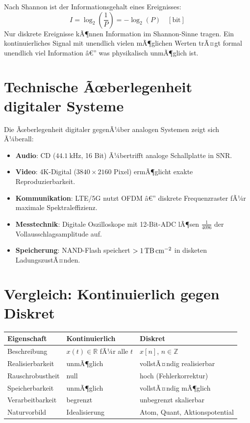 ﻿\documentclass[12pt,a4paper,titlepage]{report}
\begin{document}
Nach Shannon ist der Informationsgehalt eines Ereignisses:
\[
	I = \log_2\!\left(\frac{1}{P}\right) = -\log_2(P) \quad [\text{bit}]
\]
Nur diskrete Ereignisse kÃ¶nnen Information im Shannon-Sinne tragen. 
Ein kontinuierliches Signal mit unendlich vielen mÃ¶glichen Werten trÃ¤gt 
formal unendlich viel Information â€” was physikalisch unmÃ¶glich ist.

\section{Technische Ãœberlegenheit digitaler Systeme}

Die Ãœberlegenheit digitaler gegenÃ¼ber analogen Systemen zeigt sich Ã¼berall:

\begin{itemize}[leftmargin=2em]
	\item \textbf{Audio}: CD ($\SI{44.1}{\kilo\hertz}$, 16 Bit) Ã¼bertrifft analoge Schallplatte in SNR.
	\item \textbf{Video}: 4K-Digital ($3840 \times 2160$ Pixel) ermÃ¶glicht exakte Reproduzierbarkeit.
	\item \textbf{Kommunikation}: LTE/5G nutzt OFDM â€” diskrete Frequenzraster fÃ¼r 
		maximale Spektraleffizienz.
	\item \textbf{Messtechnik}: Digitale Oszilloskope mit 12-Bit-ADC lÃ¶sen 
		$\frac{1}{4096}$ der Vollausschlagsamplitude auf.
	\item \textbf{Speicherung}: NAND-Flash speichert $> \SI{1}{\tera\byte\per\centi\meter\squared}$ 
		in disketen LadungszustÃ¤nden.
\end{itemize}

\section{Vergleich: Kontinuierlich gegen Diskret}

\begin{center}
\begin{tabular}{lll}
\toprule
\textbf{Eigenschaft} & \textbf{Kontinuierlich} & \textbf{Diskret} \\
\midrule
Beschreibung & $x(t) \in \mathbb{R}$ fÃ¼r alle $t$ & $x[n]$, $n \in \mathbb{Z}$ \\
Realisierbarkeit & unmÃ¶glich & vollstÃ¤ndig realisierbar \\
Rauschrobustheit & null & hoch (Fehlerkorrektur) \\
Speicherbarkeit & unmÃ¶glich & vollstÃ¤ndig mÃ¶glich \\
Verarbeitbarkeit & begrenzt & unbegrenzt skalierbar \\
Naturvorbild & Idealisierung & Atom, Quant, Aktionspotential \\
\bottomrule
\end{tabular}
\end{center}
\end{document}
